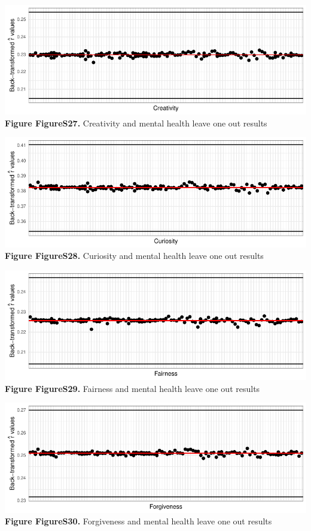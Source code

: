 \documentclass[
  letterpaper,
  DIV=11,
  numbers=noendperiod]{scrartcl}
\begin{document}
\includegraphics{SupplementaryResults_files/figure-pdf/unnamed-chunk-12-3.pdf}\textbf{Figure
FigureS27.} Creativity and mental health leave one out results

\includegraphics{SupplementaryResults_files/figure-pdf/unnamed-chunk-12-4.pdf}\textbf{Figure
FigureS28.} Curiosity and mental health leave one out results

\includegraphics{SupplementaryResults_files/figure-pdf/unnamed-chunk-12-5.pdf}\textbf{Figure
FigureS29.} Fairness and mental health leave one out results

\includegraphics{SupplementaryResults_files/figure-pdf/unnamed-chunk-12-6.pdf}\textbf{Figure
FigureS30.} Forgiveness and mental health leave one out results
\end{document}
